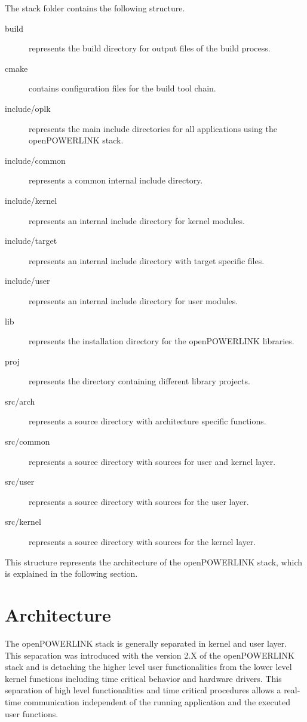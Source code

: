 The stack folder contains the following structure. \cite[Directory Structure]{openpowerlink_doc}
\begin{description}
    \item[build] represents the build directory for output files of the build process.
    \item[cmake] contains configuration files for the build tool chain.
    \item[include/oplk] represents the main include directories for all applications using the openPOWERLINK stack.
    \item[include/common] represents a common internal include directory.
    \item[include/kernel] represents an internal include directory for kernel modules.
    \item[include/target] represents an internal include directory with target specific files.
    \item[include/user] represents an internal include directory for user modules.
    \item[lib] represents the installation directory for the openPOWERLINK libraries.
    \item[proj] represents the directory containing different library projects.
    \item[src/arch] represents a source directory with architecture specific functions.
    \item[src/common] represents a source directory with sources for user and kernel layer.
    \item[src/user] represents a source directory with sources for the user layer.
    \item[src/kernel] represents a source directory with sources for the kernel layer.
\end{description}

This structure represents the architecture of the openPOWERLINK stack, which is explained in the following section.

\section{Architecture}
\label{sec:oplk_architecture}
\begin{sloppypar}
The openPOWERLINK stack is generally separated in kernel and user layer.
This separation was introduced with the version 2.X of the openPOWERLINK stack and is detaching the higher level user functionalities from the lower level kernel functions including time critical behavior and hardware drivers.
This separation of high level functionalities and time critical procedures allows a real-time communication independent of the running application and the executed user functions.
\end{sloppypar}

